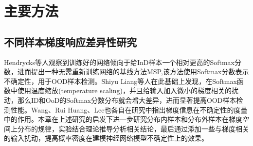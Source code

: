    




\section{主要方法}
\subsection{不同样本梯度响应差异性研究}
Hendrycks等人\cite{hendrycks2017a}观察到训练好的网络倾向于给InD样本一个相对更高的Softmax分数，进而提出一种无需重新训练网络的基线方法MSP,该方法使用Softmax分数表示不确定性，用于OOD样本检测。Shiyu Liang等人\cite{liang2017enhancing}在此基础上发现，在Softmax函数中使用温度缩放(temperature scaling)，并且给输入加入微小的梯度相关的扰动，那么ID和OoD的Softmax分数分布就会增大差异，进而显著提高OOD样本检测性能。Wang\cite{wang2023gradient}、Rui Huang\cite{huang2021importance}、Lee\cite{lee2020gradients}也各自在研究中指出梯度信息在不确定性的度量中的作用。本章在上述研究的启发下进一步研究分布内样本和分布外样本在梯度空间上分布的规律，实验结合理论推导分析相关结论，最后通过添加一些与梯度相关的输入扰动，提高概率密度在建模神经网络模型不确定性上的效果。

